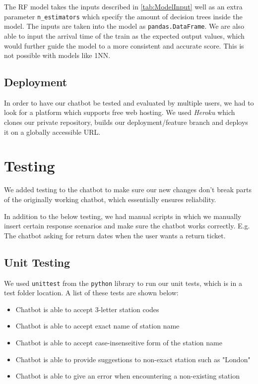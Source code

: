 \documentclass[11pt]{article}
\newcommand{\code}[1]{{\texttt{#1}}}
\begin{document}
        The RF model takes the inputs described in \cref{tab:ModelInput} well as an extra parameter \code{n\_estimators} which specify the amount of decision trees inside the model. The inputs are taken into the model as \code{pandas.DataFrame}. We are also able to input the arrival time of the train as the expected output values, which would further guide the model to a more consistent and accurate score. This is not possible with models like 1NN.
        
        

    \subsection{Deployment}\label{sec:deploy}
    In order to have our chatbot be tested and evaluated by multiple users, we had to look for a platform which supports free web hosting. We used \textit{Heroku} which clones our private repository, builds our deployment/feature branch and deploys it on a globally accessible URL.


\section{Testing}
We added testing to the chatbot to make sure our new changes don't break parts of the originally working chatbot, which essentially ensures reliability.

In addition to the below testing, we had manual scripts in which we manually insert certain response scenarios  and make sure the chatbot works correctly. E.g. The chatbot asking for return dates when the user wants a return ticket.

\subsection{Unit Testing}

We used \code{unittest} from the \code{python} library to run our unit tests, which is in a test folder location. A list of these tests are shown below:

\begin{itemize}
    \item Chatbot is able to accept 3-letter station codes
    \item Chatbot is able to accept exact name of station name
    \item Chatbot is able to accept case-insenseitive form of the station name
    \item Chatbot is able to provide suggestions to non-exact station such as "London"
    \item Chatbot is able to give an error when encountering a non-existing station
\end{itemize}
\end{document}
